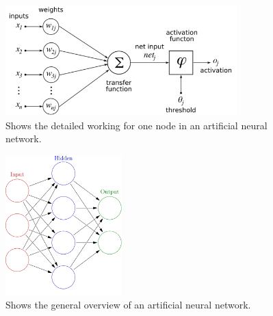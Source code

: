 \begin{figure}
\centering
\includegraphics[width=0.8\textwidth]{images/nn_detail.png}
\caption{\label{fig:nnd} Shows the detailed working for one node in an artificial neural network.}
\end{figure}

\begin{figure}
\centering
\includegraphics[width=0.4\textwidth]{images/nn_overview.png}
\caption{\label{fig:nno} Shows the general overview of an artificial neural network.}
\end{figure}